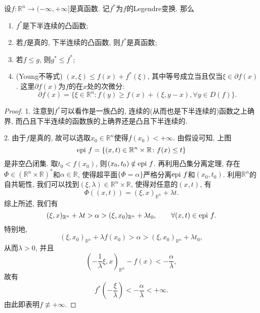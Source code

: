\begin{proposition}
    设$f\colon \mathbb{R}^n \rightarrow (-\infty, +\infty]$是真函数. 记$f^*$为$f$的Legendre变换.
    那么 
    \begin{enumerate}
        \item $f^*$是下半连续的凸函数;
        \item 若$f$是真的, 下半连续的凸函数, 则$f^*$是真函数;
        \item 若$f \leq g$, 则$g^* \leq f^*$; \label{prop2.63-3}
        \item (Young不等式) $(x, \xi) \leq f(x) + f^*(\xi)$, 其中等号成立当且仅当$\xi \in \partial f(x)$. \label{prop2.63-4}
        这里$\partial f(x)$为$f$的在$x$处的次微分:
        \begin{equation*}
            \partial f(x) = \{\xi \in \mathbb{R}^n\colon f(y) \geq f(x) + (\xi, y - x), \forall y \in D(f)\}.
        \end{equation*}
    \end{enumerate}
    \begin{proof}
        1. 注意到$f^*$可以看作是一族凸的, 连续的(从而也是下半连续的)函数之上确界, 而凸且下半连续的函数族的上确界还是凸且下半连续的.

        2. 由于$f$是真的, 故可以选取$x_0 \in \mathbb{R}^n$使得$f(x_0) < +\infty$.
        由假设可知, 上图
        \begin{equation*}
            {\rm epi}\ f = \{(x, t) \in \mathbb{R}^n \times \mathbb{R}\colon f(x) \leq t\}
        \end{equation*}
        是非空凸闭集. 取$t_0 < f(x_0)$, 则$(x_0, t_0) \notin {\rm epi}\ f$. 再利用凸集分离定理, 存在$\Phi \in (\mathbb{R}^n \times \mathbb{R})^*$和$\alpha \in \mathbb{R}$, 使得超平面$\{\Phi = \alpha\}$严格分离${\rm epi}\ f$和$(x_0, t_0)$.
        利用$\mathbb{R}^n$的自共轭性, 我们可以找到$(\xi, \lambda) \in \mathbb{R}^n \times \mathbb{R}$, 使得对任意的$(x, t)$, 有 
        \begin{equation*}
            \Phi((x, t)) = (\xi, x)_{\mathbb{R}^n} + \lambda t.
        \end{equation*}
        综上所述, 我们有 
        \begin{equation*}
            (\xi, x)_{\mathbb{R}^n} + \lambda t > \alpha > (\xi, x_0)_{\mathbb{R}^n} + \lambda t_0, \qquad \forall (x, t) \in {\rm epi}\ f.
        \end{equation*}
        特别地, 
        \begin{equation*}
            (\xi, x_0)_{\mathbb{R}^n} + \lambda f(x_0) > \alpha > (\xi, x_0)_{\mathbb{R}^n} + \lambda t_0,
        \end{equation*}
        从而$\lambda > 0$, 并且 
        \begin{equation*}
            \left(-\frac{1}{\lambda}\xi, x\right)_{\mathbb{R}^n} - f(x) < -\frac{\alpha}{\lambda},
        \end{equation*}
        故有 
        \begin{equation*}
            f^*\left(-\frac{\xi}{\lambda}\right) < -\frac{\alpha}{\lambda} < +\infty.
        \end{equation*}
        由此即表明$f \not\equiv +\infty$.
    

\end{proof}
\end{proposition}
